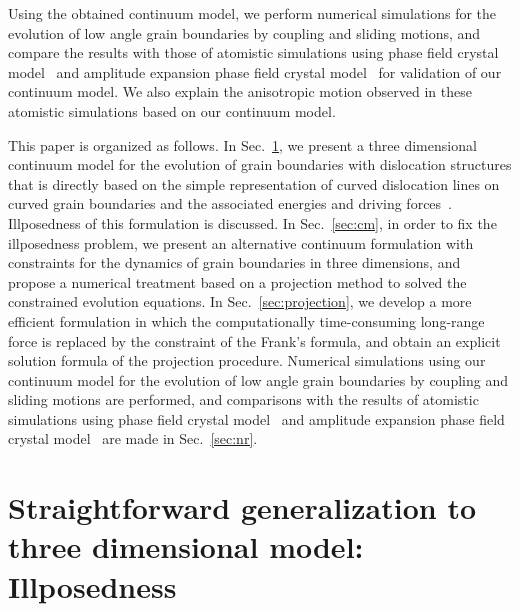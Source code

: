 
Using the obtained continuum model, we perform numerical simulations for the evolution of low angle grain boundaries by coupling and sliding motions, and compare the results with those of atomistic simulations using phase field crystal model~\cite{yamanaka2017phase} and amplitude expansion phase field crystal model~\cite{salvalaglio2018defects} for validation of our continuum model. We also explain the anisotropic motion observed in these atomistic simulations based on our continuum model.


This paper is organized as follows. In Sec.~\ref{sec:illposed}, we present a three dimensional continuum model for the evolution of grain boundaries with dislocation structures that is directly based on the simple representation of curved dislocation lines on curved grain boundaries and the associated energies and driving forces~\cite{zhu2014continuum}. Illposedness of this formulation is discussed.
In Sec.~\ref{sec:cm}, in order to fix the illposedness problem, we present an alternative continuum formulation with constraints for the dynamics of grain boundaries in three dimensions, and propose
a numerical treatment based on a projection method  to solved the constrained evolution equations.
In Sec.~\ref{sec:projection}, we develop a more efficient formulation in which the computationally time-consuming long-range force is replaced by the constraint of the Frank’s formula, and obtain an explicit solution formula of the projection procedure.  Numerical simulations using our continuum model for the evolution of low angle grain boundaries by coupling and sliding motions are performed, and comparisons with the results of atomistic simulations using phase field crystal model~\cite{yamanaka2017phase} and amplitude expansion phase field crystal model~\cite{salvalaglio2018defects}
are made in Sec.~\ref{sec:nr}.

\section{Straightforward generalization to three dimensional model: Illposedness}\label{sec:illposed}

